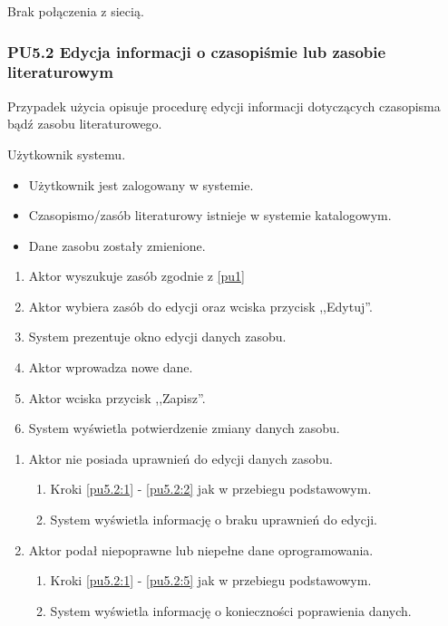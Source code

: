 Brak połączenia z siecią.

\subsubsection{PU5.2 Edycja informacji o czasopiśmie lub zasobie literaturowym}

Przypadek użycia opisuje procedurę edycji informacji dotyczących czasopisma bądź zasobu literaturowego.

Użytkownik systemu.

\begin{itemize}
\item Użytkownik jest zalogowany w systemie.
\item Czasopismo/zasób literaturowy istnieje w systemie katalogowym.
\end{itemize}

\begin{itemize}
\item Dane zasobu zostały zmienione.
\end{itemize}

\begin{enumerate}
\item \label{pu5.2:1} Aktor wyszukuje zasób zgodnie z \ref{pu1}
\item \label{pu5.2:2} Aktor wybiera zasób do edycji oraz wciska przycisk ,,Edytuj''.
\item System prezentuje okno edycji danych zasobu.
\item Aktor wprowadza nowe dane.
\item \label{pu5.2:5} Aktor wciska przycisk ,,Zapisz''.
\item System wyświetla potwierdzenie zmiany danych zasobu.
\end{enumerate}

\begin{enumerate}
\item Aktor nie posiada uprawnień do edycji danych zasobu.
	\begin{enumerate}[label*=\arabic*.]
		\item Kroki \ref{pu5.2:1} - \ref{pu5.2:2} jak w przebiegu podstawowym.
		\item System wyświetla informację o braku uprawnień do edycji.
	\end{enumerate}
\item Aktor podał niepoprawne lub niepełne dane oprogramowania.
	\begin{enumerate}[label*=\arabic*.]
		\item Kroki \ref{pu5.2:1} - \ref{pu5.2:5} jak w przebiegu podstawowym.
		\item System wyświetla informację o konieczności poprawienia danych.
	\end{enumerate}
\end{enumerate}

